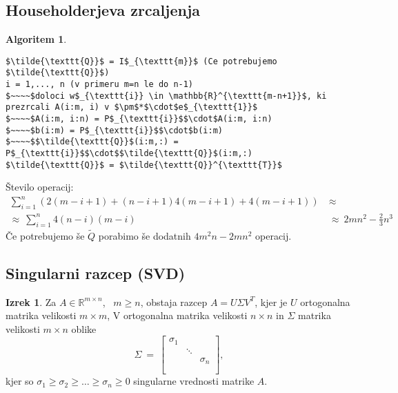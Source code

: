 \documentclass[11pt]{article}
\theoremstyle{definition}
\newtheorem{izrek}{Izrek}
\newtheorem*{algoritem}{Algoritem}
\begin{document}

\subsection{Householderjeva zrcaljenja}

\begin{algoritem}
~
\begin{lstlisting}
$\tilde{\texttt{Q}}$ = I$_{\texttt{m}}$ (Ce potrebujemo $\tilde{\texttt{Q}}$)
i = 1,..., n (v primeru m=n le do n-1)
$~~~~$doloci w$_{\texttt{i}} \in \mathbb{R}^{\texttt{m-n+1}}$, ki prezrcali A(i:m, i) v $\pm$*$\cdot$e$_{\texttt{1}}$
$~~~~$A(i:m, i:n) = P$_{\texttt{i}}$$\cdot$A(i:m, i:n)
$~~~~$b(i:m) = P$_{\texttt{i}}$$\cdot$b(i:m)
$~~~~$$\tilde{\texttt{Q}}$(i:m,:) = P$_{\texttt{i}}$$\cdot$$\tilde{\texttt{Q}}$(i:m,:)
$\tilde{\texttt{Q}}$ = $\tilde{\texttt{Q}}^{\texttt{T}}$
\end{lstlisting}
Število operacij:
\begin{align*}
\sum_{i=1}^n (2(m-i+1) + (n-i+1)4(m-i+1) + 4(m-i+1)) ~&\approx~ \\
\approx~ \sum_{i=1}^n 4(n-i)(m-i) ~&\approx~ 2mn^2 - \frac{2}{3}n^3
\end{align*}
Če potrebujemo še $\tilde{Q}$ porabimo še dodatnih $4m^2n - 2mn^2$ operacij.

\end{algoritem}
\vspace{0.5cm}

\pagebreak


\subsection{Singularni razcep (SVD)}
\vspace{0.5cm}

\begin{izrek}

Za $A \in \mathbb{R}^{m \times n}$, ~$m \geq n$, obstaja razcep $A = U \Sigma V^T$, kjer je $U$ ortogonalna matrika velikosti $m \times m$, V ortogonalna matrika velikosti $n \times n$ in $\Sigma$ matrika velikosti $m \times n$ oblike
$$\Sigma ~=~ \begin{bmatrix}
\sigma_1 & ~ & ~ \\
~ & \ddots & ~ \\
~ & ~ & \sigma_n \\
~ \\
~
\end{bmatrix},$$
kjer so $\sigma_1 \geq \sigma_2 \geq \ldots \geq \sigma_n \geq 0$ singularne vrednosti matrike $A$.

\end{izrek}
\vspace{0.5cm}
\end{document}
